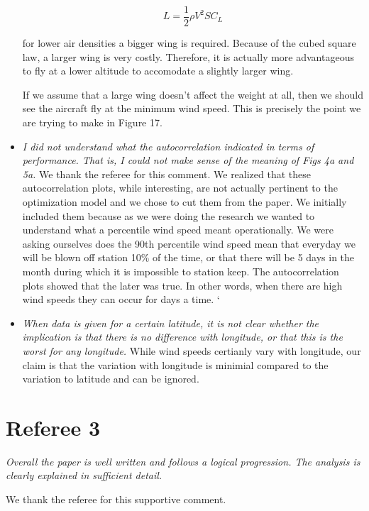 \documentclass[10pt, a4paper]{article}
\begin{document}
\begin{itemize}
    \begin{equation}
        L = \frac{1}{2} \rho V^2 S C_L
    \end{equation}

    for lower air densities a bigger wing is required.  Because of the cubed square law, a larger wing is very costly.  Therefore, it is actually more advantageous to fly at a lower altitude to accomodate a slightly larger wing.  

    If we assume that a large wing doesn't affect the weight at all, then we should see the aircraft fly at the minimum wind speed.  This is precisely the point we are trying to make in Figure 17.  

    \item \emph{I did not understand what the autocorrelation indicated in terms of performance. That is, I could not make sense of the meaning of Figs 4a and 5a.}
        We thank the referee for this comment.  We realized that these autocorrelation plots, while interesting, are not actually pertinent to the optimization model and we chose to cut them from the paper.  We initially included them because as we were doing the research we wanted to understand what a percentile wind speed meant operationally.  We were asking ourselves does the 90th percentile wind speed mean that everyday we will be blown off station 10\% of the time, or that there will be 5 days in the month during which it is impossible to station keep.  The autocorrelation plots showed that the later was true.  In other words, when there are high wind speeds they can occur for days a time. `

    \item \emph{When data is given for a certain latitude, it is not clear whether the implication is that there is no difference with longitude, or that this is the worst for any longitude.}
        While wind speeds certianly vary with longitude, our claim is that the variation with longitude is minimial compared to the variation to latitude and can be ignored.  

    \end{itemize}

\section*{Referee 3}
\emph{Overall the paper is well written and follows a logical progression. The analysis is clearly explained in sufficient detail. }

    We thank the referee for this supportive comment. 
\end{document}
